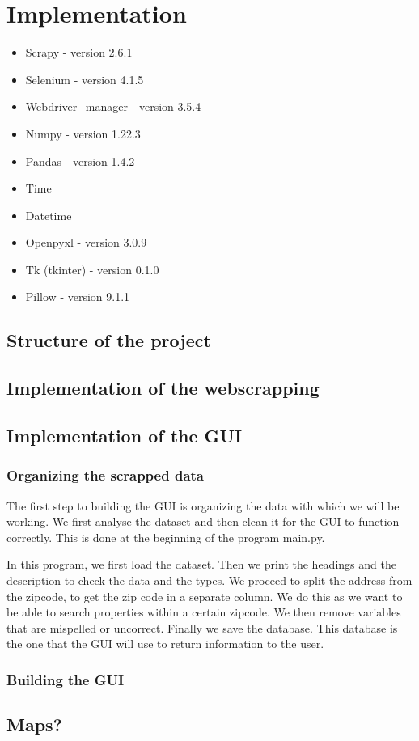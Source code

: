 \documentclass[main]{subfiles}
\begin{document}
\section{Implementation}
\begin{itemize}
    \item Scrapy -  version 2.6.1
    \item Selenium - version 4.1.5
    \item Webdriver\_manager - version 3.5.4
    \item Numpy -  version 1.22.3
    \item Pandas  - version 1.4.2
    \item Time
    \item Datetime
    \item Openpyxl - version 3.0.9
    \item Tk (tkinter) - version 0.1.0
    \item Pillow - version 9.1.1
\end{itemize}

\subsection{Structure of the project}

\subsection{Implementation of the webscrapping}

\subsection{Implementation of the GUI}

\subsubsection{Organizing the scrapped data}
The first step to building the GUI is organizing the data with which we will be working.
We first analyse the dataset and then clean it for the GUI to function correctly.
This is done at the beginning of the program main.py. \par
In this program, we first load the dataset. 
Then we print the headings and the description to check the data and the types.
We proceed to split the address from the zipcode, to get the zip code in a separate column. 
We do this as we want to be able to search properties within a certain zipcode. 
We then remove variables that are mispelled or uncorrect. 
Finally we save the database. This database is the one that the GUI will use to return information to the user.

\subsubsection{Building the GUI}

\subsection{Maps?}
\end{document}

